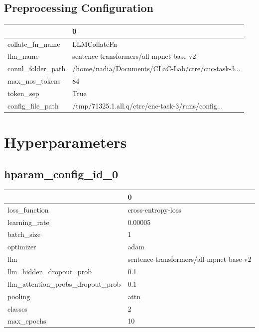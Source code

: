 \documentclass{article}
\begin{document}
\subsection{Preprocessing Configuration}
\begin{tabular}{ll}
\toprule
{} &                                                  0 \\
\midrule
collate\_fn\_name   &                                       LLMCollateFn \\
llm\_name          &            sentence-transformers/all-mpnet-base-v2 \\
connl\_folder\_path &  /home/nadia/Documents/CLaC-Lab/ctre/cnc-task-3... \\
max\_nos\_tokens    &                                                 84 \\
token\_sep         &                                               True \\
config\_file\_path  &  /tmp/71325.1.all.q/ctre/cnc-task-3/runs/config... \\
\bottomrule
\end{tabular}

\section{Hyperparameters}
\subsection{hparam\_config\_id\_0}
\begin{tabular}{ll}
\toprule
{} &                                        0 \\
\midrule
loss\_function                    &                       cross-entropy-loss \\
learning\_rate                    &                                  0.00005 \\
batch\_size                       &                                        1 \\
optimizer                        &                                     adam \\
llm                              &  sentence-transformers/all-mpnet-base-v2 \\
llm\_hidden\_dropout\_prob          &                                      0.1 \\
llm\_attention\_probs\_dropout\_prob &                                      0.1 \\
pooling                          &                                     attn \\
classes                          &                                        2 \\
max\_epochs                       &                                       10 \\
\bottomrule
\end{tabular}
\end{document}
